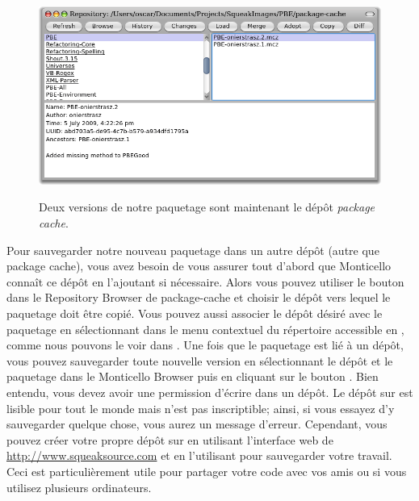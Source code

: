 \documentclass[a4paper,10pt,twoside]{book}
\begin{document}
\begin{figure}[tbp]
	\begin{center}
		{\includegraphics[width=\textwidth]{package-cache-browser}}
	\end{center}
	\caption{Deux versions de notre paquetage sont maintenant le dépôt \emph{package cache}.}
\end{figure}

Pour sauvegarder notre nouveau paquetage dans un autre
dépôt (autre que package cache), vous avez besoin de vous 
assurer tout d'abord que Monticello connaît
ce dépôt en l'ajoutant si nécessaire.
Alors vous pouvez utiliser le bouton  dans le 
Repository Browser de package-cache et choisir le dépôt vers lequel
le paquetage doit être copié.
Vous pouvez aussi associer le dépôt désiré avec le paquetage
en sélectionnant  
dans le menu contextuel du répertoire accessible en \actclickant{},
comme nous pouvons le voir dans .
Une fois que le paquetage est lié à un dépôt, vous pouvez sauvegarder
toute nouvelle version en sélectionnant le dépôt et le paquetage
dans le Monticello Browser puis en cliquant sur le bouton 
 .  
Bien entendu, vous devez avoir une permission d'écrire dans un dépôt.
Le dépôt  sur \emphind{\sqsrc} est
lisible pour tout le monde mais n'est pas inscriptible; ainsi, si vous
essayez d'y sauvegarder quelque chose, vous aurez un message d'erreur.
Cependant, vous pouvez créer votre propre dépôt sur 
\sqsrc en utilisant l'interface web de \url{http://www.squeaksource.com} et 
en l'utilisant pour sauvegarder votre travail.
Ceci est particulièrement utile pour partager votre code avec vos amis ou
si vous utilisez plusieurs ordinateurs.
\end{document}
